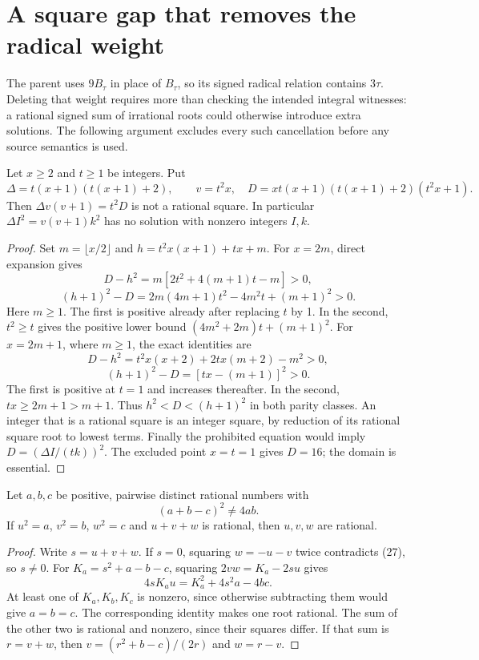 \section{A square gap that removes the radical weight}
\label{sec:gap}

The parent uses $9B_\tau$ in place of $B_\tau$, so its signed radical
relation contains $3\tau$. Deleting that weight requires more than checking
the intended integral witnesses: a rational signed sum of irrational
roots could otherwise introduce extra solutions. The following argument
excludes every such cancellation before any source semantics is used.

\begin{lemma}
\label{lem:gap}
Let $x\ge2$ and $t\ge1$ be integers. Put
\[
\Delta=t(x+1)(t(x+1)+2),\qquad v=t^2x,
\quad D=xt(x+1)(t(x+1)+2)(t^2x+1).
\]
Then $\Delta v(v+1)=t^2D$ is not a rational square.
In particular $\Delta I^2=v(v+1)k^2$ has no solution with nonzero
integers $I,k$.
\end{lemma}

\begin{proof}
Set $m=\lfloor x/2\rfloor$ and $h=t^2x(x+1)+tx+m$.
For $x=2m$, direct expansion gives
\[
D-h^2=m[2t^2+4(m+1)t-m]>0,
\tag{23}
\]
\[
(h+1)^2-D=2m(4m+1)t^2-4m^2t+(m+1)^2>0.
\tag{24}
\]
Here $m\ge1$. The first is positive already after replacing $t$ by 1.
In the second, $t^2\ge t$ gives the positive lower bound
$(4m^2+2m)t+(m+1)^2$.
For $x=2m+1$, where $m\ge1$, the exact identities are
\[
D-h^2=t^2x(x+2)+2tx(m+2)-m^2>0,
\tag{25}
\]
\[
(h+1)^2-D=[tx-(m+1)]^2>0.
\tag{26}
\]
The first is positive at $t=1$ and increases thereafter. In the second,
$tx\ge2m+1>m+1$. Thus $h^2<D<(h+1)^2$ in both parity classes.
An integer that is a rational square is an integer square, by reduction
of its rational square root to lowest terms.
Finally the prohibited equation would imply $D=(\Delta I/(tk))^2$.
The excluded point $x=t=1$ gives $D=16$; the domain is essential.
\end{proof}

\begin{lemma}
\label{lem:rational}
Let $a,b,c$ be positive, pairwise distinct rational numbers with
\[
(a+b-c)^2\ne4ab.
\tag{27}
\]
If $u^2=a$, $v^2=b$, $w^2=c$ and $u+v+w$ is rational, then
$u,v,w$ are rational.
\end{lemma}

\begin{proof}
Write $s=u+v+w$. If $s=0$, squaring $w=-u-v$ twice contradicts
(27), so $s\ne0$. For $K_a=s^2+a-b-c$, squaring
$2vw=K_a-2su$ gives
\[
4sK_a u=K_a^2+4s^2a-4bc.
\tag{28}
\]
At least one of $K_a,K_b,K_c$ is nonzero, since otherwise subtracting
them would give $a=b=c$. The corresponding identity makes one root
rational. The sum of the other two is rational and nonzero, since their
squares differ. If that sum is $r=v+w$, then
$v=(r^2+b-c)/(2r)$ and $w=r-v$.
\end{proof}

